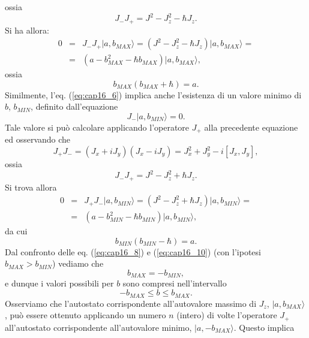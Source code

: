 ossia 
\begin{equation}
J_-J_+ = J^2 -J_z ^2 -\hbar J_z .
\label{eq:cap16_7}
\end{equation}
Si ha allora:
\begin{eqnarray}
0&=&J_{-}J_{+} \vert a, b_{MAX} \rangle = (J^2 -J_z ^2 -\hbar J_z)\vert a, b_{MAX} \rangle = \nonumber \\
&=&(a- b_{MAX} ^2 - \hbar b_{MAX} )\vert a, b_{MAX} \rangle,
\end{eqnarray}
ossia
\begin{equation}
b_{MAX}(b_{MAX}+\hbar) =a .
\label{eq:cap16_8}
\end{equation}
Similmente, l'eq. (\ref{eq:cap16_6}) implica anche l'esistenza di un valore minimo di $b$,  $b_{MIN}$, definito dall'equazione
\begin{equation}
J_{-} \vert a, b_{MIN} \rangle =0.
\end{equation}
Tale valore si può calcolare applicando l'operatore $J_+$ alla precedente equazione ed osservando che
\begin{equation}
J_+J_- = (J_x+iJ_y)(J_x-iJ_y)= J_x^2 +J_y ^2-i[J_x, J_y] ,
\end{equation}
ossia
\begin{equation}
J_-J_+ = J^2 -J_z ^2 +\hbar J_z .
\label{eq:cap16_9}
\end{equation}
Si trova allora
\begin{eqnarray}
0&=&J_{+}J_{-} \vert a, b_{MIN} \rangle = (J^2 -J_z ^2 +\hbar J_z)\vert a, b_{MIN} \rangle = \nonumber \\
&=&(a- b_{MIN} ^2 - \hbar b_{MIN} )\vert a, b_{MIN} \rangle ,
\end{eqnarray}
da cui
\begin{equation}
b_{MIN}(b_{MIN}-\hbar) =a .
\label{eq:cap16_10}
\end{equation}
Dal confronto delle eq. (\ref{eq:cap16_8}) e (\ref{eq:cap16_10}) (con l'ipotesi $b_{MAX} > b_{MIN}$) vediamo che
\begin{equation}
b_{MAX} = - b_{MIN} ,
\end{equation}
e dunque i valori possibili per $b$ sono compresi nell'intervallo
\begin{equation}
-b_{MAX} \leq b \leq b_{MAX} .
\end{equation}
Osserviamo che l'autostato corrispondente all'autovalore massimo di $J_z$, $\vert a, b_{MAX}\rangle$, può essere ottenuto applicando un numero $n$ (intero) di volte l'operatore $J_+$ all'autostato corrispondente all'autovalore minimo, $\vert a, - b_{MAX}\rangle $. Questo implica
